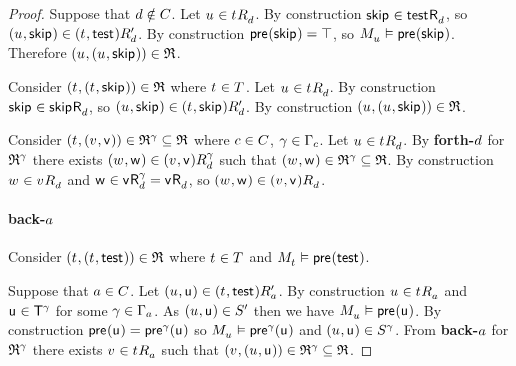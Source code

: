 \begin{proof}
Suppose that $d \notin C$.
Let $\kStateU \in \kSuccessorsD{\kStateT}$.
By construction $\aStateSkip \in \aSuccessorsD{\aStateTest}$, so $(\kStateU, \aStateSkip) \in \kSuccessorsPD{(\kStateT, \aStateTest)}$.
By construction $\aPrecondition(\aStateSkip) = \top$, so $\kPModel{\kStateU} \entails \aPrecondition(\aStateSkip)$.
Therefore $(\kStateU, (\kStateU, \aStateSkip)) \in \refinement$.

Consider $(\kStateT, (\kStateT, \aStateSkip)) \in \refinement$ where $\kStateT \in \kStatesT$.
Let $\kStateU \in \kSuccessorsD{\kStateT}$.
By construction $\aStateSkip \in \aSuccessorsD{\aStateSkip}$, so $(\kStateU, \aStateSkip) \in \kSuccessorsPD{(\kStateT, \aStateSkip)}$.
By construction $(\kStateU, (\kStateU, \aStateSkip)) \in \refinement$.

Consider $(\kStateT, (\kStateV, \aStateV)) \in \refinement^\gamma \subseteq \refinement$ where $c \in C$, $\gamma \in \Gamma_c$.
Let $\kStateU \in \kSuccessorsD{\kStateT}$.
By {\bf forth-$d$} for $\mathfrak{R}^\gamma$ there exists $(\kStateW, \aStateW) \in \kSuccessorsD[\gamma]{(\kStateV, \aStateV)}$ such that $(\kStateW, \aStateW) \in \refinement^\gamma \subseteq \refinement$.
By construction $\kStateW \in \kSuccessorsD{\kStateV}$ and $\aStateW \in \aSuccessorsD[\gamma]{\aStateV} = \aSuccessorsD{\aStateV}$, so $(\kStateW, \aStateW) \in \kSuccessorsD{(\kStateV, \aStateV)}$.

\paragraph{back-$a$}
Consider $(\kStateT, (\kStateT, \aStateTest)) \in \refinement$ where $\kStateT \in \kStatesT$ and $\kPModel{\kStateT} \entails \aPrecondition(\aStateTest)$.

Suppose that $a \in C$.
Let $(\kStateU, \aStateU) \in \kSuccessorsPA{(\kStateT, \aStateTest)}$.
By construction $\kStateU \in \kSuccessorsA{\kStateT}$ and $\aStateU \in \aStatesT[\gamma]$ for some $\gamma \in \Gamma_a$.
As $(\kStateU, \aStateU) \in \kStatesP$ then we have $\kPModel{\kStateU} \entails \aPrecondition(\aStateU)$.
By construction $\aPrecondition(\aStateU) = \aPrecondition[\gamma](\aStateU)$ so $\kPModel{\kStateU} \entails \aPrecondition[\gamma](\aStateU)$ and $(\kStateU, \aStateU) \in \kStates[\gamma]$.
From {\bf back-$a$} for $\mathfrak{R}^\gamma$ there exists $\kStateV \in \kSuccessorsA{\kStateT}$ such that $(\kStateV, (\kStateU, \aStateU)) \in \refinement^\gamma \subseteq \refinement$.


\end{proof}
